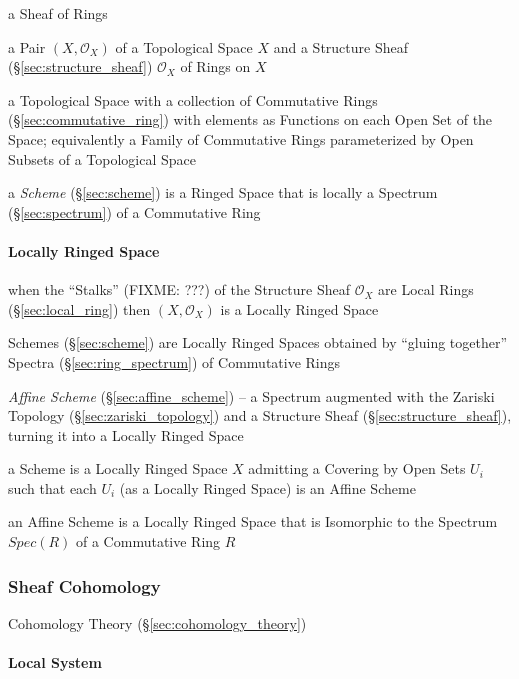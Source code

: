 a Sheaf of Rings

a Pair $(X,\mathcal{O}_X)$ of a Topological Space $X$ and a Structure Sheaf
(\S\ref{sec:structure_sheaf}) $\mathcal{O}_X$ of Rings on $X$

a Topological Space with a collection of Commutative Rings
(\S\ref{sec:commutative_ring}) with elements as Functions on each Open Set of
the Space; equivalently a Family of Commutative Rings parameterized by Open
Subsets of a Topological Space

a \emph{Scheme} (\S\ref{sec:scheme}) is a Ringed Space that is locally a
Spectrum (\S\ref{sec:spectrum}) of a Commutative Ring



\paragraph{Locally Ringed Space}\label{sec:locally_ringed_space}\hfill

when the ``Stalks'' (FIXME: ???) of the Structure Sheaf $\mathcal{O}_X$ are
Local Rings (\S\ref{sec:local_ring}) then $(X,\mathcal{O}_X)$ is a Locally
Ringed Space

\fist Schemes (\S\ref{sec:scheme}) are Locally Ringed Spaces obtained by
``gluing together'' Spectra (\S\ref{sec:ring_spectrum}) of Commutative Rings

\fist \emph{Affine Scheme} (\S\ref{sec:affine_scheme}) -- a Spectrum augmented
with the Zariski Topology (\S\ref{sec:zariski_topology}) and a Structure Sheaf
(\S\ref{sec:structure_sheaf}), turning it into a Locally Ringed Space

a Scheme is a Locally Ringed Space $X$ admitting a Covering by Open Sets $U_i$
such that each $U_i$ (as a Locally Ringed Space) is an Affine Scheme

an Affine Scheme is a Locally Ringed Space that is Isomorphic to the Spectrum
$Spec(R)$ of a Commutative Ring $R$



\subsubsection{Sheaf Cohomology}\label{sec:sheaf_cohomology}

\fist Cohomology Theory (\S\ref{sec:cohomology_theory})



\paragraph{Local System}\label{sec:local_system}\hfill

